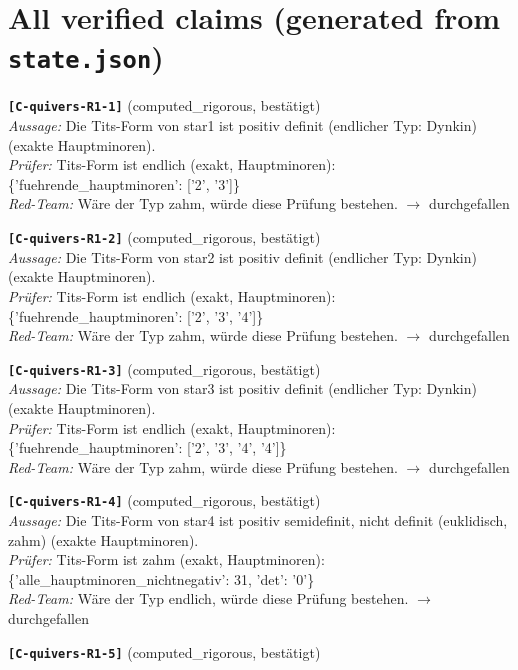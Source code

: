 \documentclass[11pt]{article}
\theoremstyle{definition}\newtheorem{definition}[theorem]{Definition}\newtheorem{remark}[theorem]{Remark}\newtheorem{observation}[theorem]{Numerical observation}
\begin{document}
\section{All verified claims (generated from \texttt{state.json})}
\small
\noindent\textbf{\texttt{[C-quivers-R1-1]}} (computed\_rigorous, bestätigt)\\
\textit{Aussage:} Die Tits-Form von star1 ist positiv definit (endlicher Typ: Dynkin) (exakte Hauptminoren).\\
\textit{Prüfer:} Tits-Form ist endlich (exakt, Hauptminoren): \{'fuehrende\_hauptminoren': ['2', '3']\}\\
\textit{Red-Team:} Wäre der Typ zahm, würde diese Prüfung bestehen. $\to$ durchgefallen\par\medskip
\noindent\textbf{\texttt{[C-quivers-R1-2]}} (computed\_rigorous, bestätigt)\\
\textit{Aussage:} Die Tits-Form von star2 ist positiv definit (endlicher Typ: Dynkin) (exakte Hauptminoren).\\
\textit{Prüfer:} Tits-Form ist endlich (exakt, Hauptminoren): \{'fuehrende\_hauptminoren': ['2', '3', '4']\}\\
\textit{Red-Team:} Wäre der Typ zahm, würde diese Prüfung bestehen. $\to$ durchgefallen\par\medskip
\noindent\textbf{\texttt{[C-quivers-R1-3]}} (computed\_rigorous, bestätigt)\\
\textit{Aussage:} Die Tits-Form von star3 ist positiv definit (endlicher Typ: Dynkin) (exakte Hauptminoren).\\
\textit{Prüfer:} Tits-Form ist endlich (exakt, Hauptminoren): \{'fuehrende\_hauptminoren': ['2', '3', '4', '4']\}\\
\textit{Red-Team:} Wäre der Typ zahm, würde diese Prüfung bestehen. $\to$ durchgefallen\par\medskip
\noindent\textbf{\texttt{[C-quivers-R1-4]}} (computed\_rigorous, bestätigt)\\
\textit{Aussage:} Die Tits-Form von star4 ist positiv semidefinit, nicht definit (euklidisch, zahm) (exakte Hauptminoren).\\
\textit{Prüfer:} Tits-Form ist zahm (exakt, Hauptminoren): \{'alle\_hauptminoren\_nichtnegativ': 31, 'det': '0'\}\\
\textit{Red-Team:} Wäre der Typ endlich, würde diese Prüfung bestehen. $\to$ durchgefallen\par\medskip
\noindent\textbf{\texttt{[C-quivers-R1-5]}} (computed\_rigorous, bestätigt)\\
\end{document}
